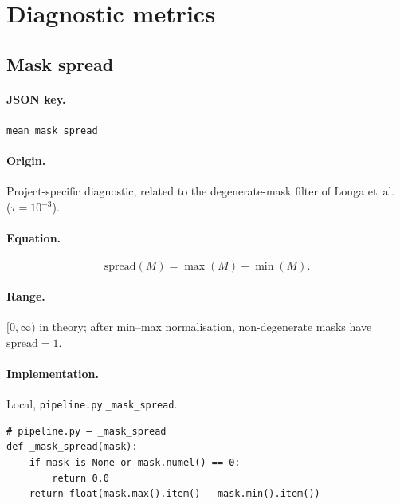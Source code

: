 \documentclass[11pt,a4paper]{article}
\newcommand{\code}[1]{\texttt{#1}}
\newcommand{\jsonkey}[1]{\texttt{#1}}
\begin{document}
\section{Diagnostic metrics}
\label{sec:diagnostics}


\subsection{Mask spread}
\label{sec:spread}

\paragraph{JSON key.} \jsonkey{mean\_mask\_spread}

\paragraph{Origin.} Project-specific diagnostic, related to the
degenerate-mask filter of Longa et~al.~\cite{longa2025} ($\tau = 10^{-3}$).

\paragraph{Equation.}
\begin{equation}
  \mathrm{spread}(M) = \max(M) - \min(M).
  \label{eq:spread}
\end{equation}

\paragraph{Range.} $[0, \infty)$ in theory; after min--max normalisation,
non-degenerate masks have $\mathrm{spread} = 1$.

\paragraph{Implementation.} Local,
\code{pipeline.py}:\code{\_mask\_spread}.

\begin{verbatim}
# pipeline.py — _mask_spread
def _mask_spread(mask):
    if mask is None or mask.numel() == 0:
        return 0.0
    return float(mask.max().item() - mask.min().item())
\end{verbatim}
\end{document}
